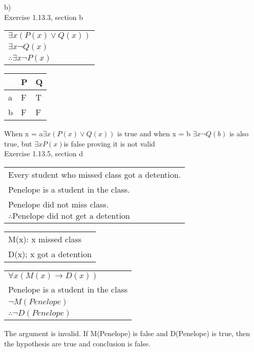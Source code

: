 \documentclass[11pt]{article}
\begin{document}
\noindent b)  \\
Exercise 1.13.3, section b\\

\begin{center}
  \begin{tabular}{l}
  $\exists x (P(x) \vee Q(x))$\\
  $\exists x \neg Q(x)$\\
     \hline
  $ \therefore \exists x \neg P(x) $
 

  \end{tabular}
\end{center}

\begin{center}
\begin{tabular}{|l|l|l|}
\hline
 & P& Q \\ \hline
a & F & T \\ \hline
b & F & F \\ \hline
\end{tabular}
\end{center}

\noindent When x = a$\exists x (P(x) \vee Q(x))$ is true and when x = b $\exists x \neg Q(b)$ is also true, but $\exists xP(x)$is false proving it is not valid\\


\noindent Exercise 1.13.5, section d
\begin{center}
  \begin{tabular}{l}
  Every student who missed class got a detention.\\
  Penelope is a student in the class.\\
  Penelope did not miss class.\\
    \hline
  $ \therefore \text{Penelope did not get a detention}$
  \end{tabular}
  
  \begin{center}
\begin{tabular}{l}

M(x): x missed class\\
D(x); x got a detention\\
\end{tabular}
\end{center}

\begin{center}
\begin{tabular}{l}
$\forall x (M(x) \rightarrow D(x))$\\
Penelope is a student in the class\\
$\neg M(Penelope)$\\
\hline
$\therefore \neg D(Penelope)$\\
\end{tabular}
\end{center}

\noindent The argument is invalid. If M(Penelope) is false and D(Penelope) is true, then the hypothesis are true and conclusion is false.\\
\end{center}
\end{document}
